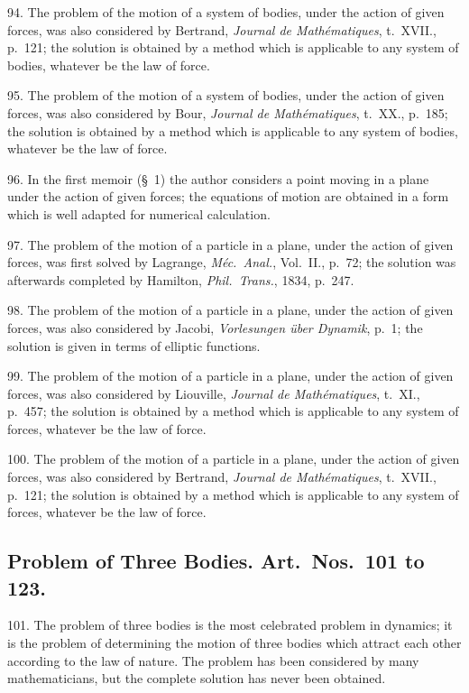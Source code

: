 \documentclass[11pt,a4paper]{book}
\begin{document}
94. The problem of the motion of a system of bodies, under the action of given forces, was also considered by Bertrand, \textit{Journal de Math\'ematiques}, t.~XVII., p.~121; the solution is obtained by a method which is applicable to any system of bodies, whatever be the law of force.

95. The problem of the motion of a system of bodies, under the action of given forces, was also considered by Bour, \textit{Journal de Math\'ematiques}, t.~XX., p.~185; the solution is obtained by a method which is applicable to any system of bodies, whatever be the law of force.

96. In the first memoir (\S~1) the author considers a point moving in a plane under the action of given forces; the equations of motion are obtained in a form which is well adapted for numerical calculation.

\newpage
\setcounter{page}{548}

97. The problem of the motion of a particle in a plane, under the action of given forces, was first solved by Lagrange, \textit{M\'ec.\ Anal.}, Vol.~II., p.~72; the solution was afterwards completed by Hamilton, \textit{Phil.\ Trans.}, 1834, p.~247.

98. The problem of the motion of a particle in a plane, under the action of given forces, was also considered by Jacobi, \textit{Vorlesungen \"uber Dynamik}, p.~1; the solution is given in terms of elliptic functions.

99. The problem of the motion of a particle in a plane, under the action of given forces, was also considered by Liouville, \textit{Journal de Math\'ematiques}, t.~XI., p.~457; the solution is obtained by a method which is applicable to any system of forces, whatever be the law of force.

100. The problem of the motion of a particle in a plane, under the action of given forces, was also considered by Bertrand, \textit{Journal de Math\'ematiques}, t.~XVII., p.~121; the solution is obtained by a method which is applicable to any system of forces, whatever be the law of force.

\subsection*{Problem of Three Bodies. Art.\ Nos.\ 101 to 123.}

101. The problem of three bodies is the most celebrated problem in dynamics; it is the problem of determining the motion of three bodies which attract each other according to the law of nature. The problem has been considered by many mathematicians, but the complete solution has never been obtained.
\end{document}
